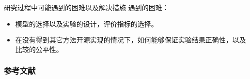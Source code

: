 \documentclass{beamer}
\begin{document}
\begin{frame}{研究过程中可能遇到的困难以及解决措施}\pause
    遇到的困难：
    \begin{itemize}
       \item 
       模型的选择以及实验的设计，评价指标的选择。
       \item 
       在没有得到其它方法开源实现的情况下，如何能够保证实验结果正确性，以及比较的公平性。
    \end{itemize}
\end{frame}

\begin{frame}[allowframebreaks]\frametitle{参考文献}
    \scriptsize
    
    
\end{frame}
\end{document}

